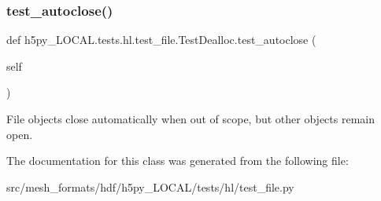 \subsubsection{\texorpdfstring{test\+\_\+autoclose()}{test\_autoclose()}}
{\footnotesize\ttfamily def h5py\+\_\+\+L\+O\+C\+A\+L.\+tests.\+hl.\+test\+\_\+file.\+Test\+Dealloc.\+test\+\_\+autoclose (\begin{DoxyParamCaption}\item[{}]{self }\end{DoxyParamCaption})}

\begin{DoxyVerb}File objects close automatically when out of scope, but
other objects remain open. \end{DoxyVerb}
 

The documentation for this class was generated from the following file\+:\begin{DoxyCompactItemize}
\item 
src/mesh\+\_\+formats/hdf/h5py\+\_\+\+L\+O\+C\+A\+L/tests/hl/test\+\_\+file.\+py\end{DoxyCompactItemize}
